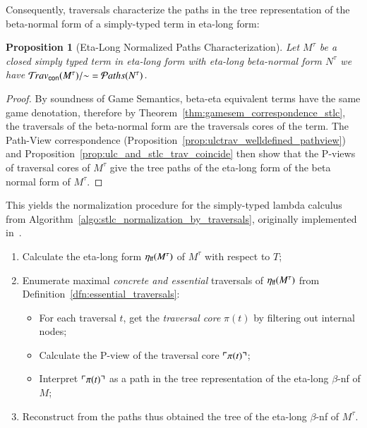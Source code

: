 \documentclass{elsarticle}
\theoremstyle{plain}
\newtheorem{proposition}[theorem]{Proposition}
\theoremstyle{definition}
\theoremstyle{remark}
\newcommand{\concrete}{{\sf con}}
\newcommand{\travsetcon}{{\travset_\concrete}}
\def\coresymbol{\pi} %
\newcommand{\core}[1]{\coresymbol(#1)} %
\newcommand\pathset{{\mathcal{P}aths}} %
\begin{document}
Consequently, traversals characterize
the paths in the tree representation of the beta-normal form of a simply-typed term in eta-long form:
\begin{proposition}[Eta-Long Normalized Paths Characterization]
\label{prop:path_charact_stlc}
Let $M^\tau$ be a closed simply typed term
in eta-long form with eta-long beta-normal form $N^\tau$
we have $\travsetcon(M^\tau)/{\sim} = \pathset(N^\tau)$.
\end{proposition}
\begin{proof}
 By soundness of Game Semantics, beta-eta equivalent terms have the same game denotation, therefore by Theorem~\ref{thm:gamesem_correspondence_stlc}, the traversals of the beta-normal form are the traversals cores of the term. The Path-View correspondence (Proposition~\ref{prop:ulctrav_welldefined_pathview}) and Proposition~\ref{prop:ulc_and_stlc_trav_coincide} then show that the P-views of traversal cores of $M^\tau$ give the tree paths of the eta-long form of the beta normal form of $M^\tau$.
\end{proof}

This yields the normalization procedure for the simply-typed lambda calculus from Algorithm~\ref{algo:stlc_normalization_by_traversals}, originally implemented in~\cite{BlumGalop2008, Blum-HogTool}.

\begin{algorithm}[!ht]
\caption{Normalization by traversals for typed terms in eta-long form}
\label{algo:stlc_normalization_by_traversals}
\begin{algorithmic}
\begin{enumerate}[nosep]
  \item Calculate the eta-long form $\eta_{\sf lf}(M^\tau)$ of $M^\tau$ with respect to $T$;
  \item Enumerate maximal \emph{concrete and essential} traversals of $\eta_{\sf lf}(M^\tau)$ from Definition~\ref{dfn:essential_traversals}:
  \begin{itemize}[nosep]
  \item For each traversal $t$, get the \emph{traversal core} $\core{t}$ by filtering out internal nodes;
  \item Calculate the P-view of the traversal core $\pview{\core{t}}$;
  \item Interpret $\pview{\core{t}}$ as a path in the tree representation of the eta-long $\beta$-nf of $M$;
  \end{itemize}
  \item Reconstruct from the paths thus obtained the tree of the eta-long $\beta$-nf of $M^\tau$.
\end{enumerate}
\end{algorithmic}
\end{algorithm}
\end{document}
